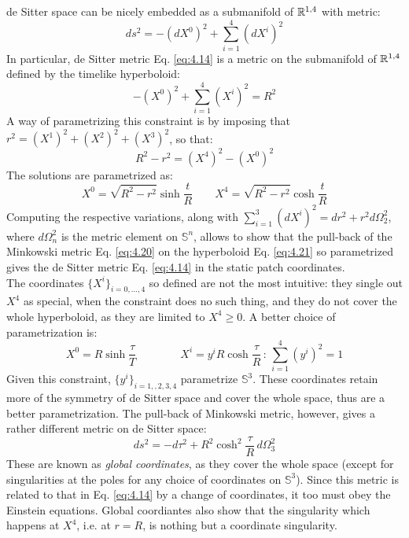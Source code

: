 de Sitter space can be nicely embedded as a submanifold of $ \mathbb{R}^{1,4} $ with metric:
\begin{equation}
  ds^2 = - (dX^0)^2 + \sum_{i = 1}^{4} (dX^i)^2
  \label{eq:4.20}
\end{equation}
In particular, de Sitter metric Eq. \ref{eq:4.14} is a metric on the submanifold of $ \mathbb{R}^{1,4} $ defined by the timelike hyperboloid:
\begin{equation}
  -(X^0)^2 + \sum_{i = 1}^{4} (X^i)^2 = R^2
  \label{eq:4.21}
\end{equation}
A way of parametrizing this constraint is by imposing that $ r^2 = (X^1)^2 + (X^2)^2 + (X^3)^2 $, so that:
\begin{equation*}
  R^2 - r^2 = (X^4)^2 - (X^0)^2
\end{equation*}
The solutions are parametrized as:
\begin{equation*}
  X^0 = \sqrt{R^2 - r^2} \sinh \frac{t}{R}
  \qquad
  X^4 = \sqrt{R^2 - r^2} \cosh \frac{t}{R}
\end{equation*}
Computing the respective variations, along with $ \sum_{i = 1}^{3} (dX^i)^2 = dr^2 + r^2 d\Omega_2^2 $, where $ d\Omega_n^2 $ is the metric element on $ \mathbb{S}^n $, allows to show that the pull-back of the Minkowski metric Eq. \ref{eq:4.20} on the hyperboloid Eq. \ref{eq:4.21} so parametrized gives the de Sitter metric Eq. \ref{eq:4.14} in the static patch coordinates.\\
The coordinates $ \{X^i\}_{i = 0,\dots,4} $ so defined are not the most intuitive: they single out $ X^4 $ as special, when the constraint does no such thing, and they do not cover the whole hyperboloid, as they are limited to $ X^4 \ge 0 $. A better choice of parametrization is:
\begin{equation*}
  X^0 = R \sinh \frac{\tau}{T}
  \qquad \qquad
  X^i = y^i R \cosh \frac{\tau}{R}
  \,:\,
  \sum_{i = 1}^{4} (y^i)^2 = 1
\end{equation*}
Given this constraint, $ \{y^i\}_{i = 1,,2,3,4} $ parametrize $ \mathbb{S}^3 $. These coordinates retain more of the symmetry of de Sitter space and cover the whole space, thus are a better parametrization. The pull-back of Minkowski metric, however, gives a rather different metric on de Sitter space:
\begin{equation}
  ds^2 = - d\tau^2 + R^2 \cosh^2 \frac{\tau}{R}\, d\Omega_3^2
  \label{eq:4.22}
\end{equation}
These are known as \textit{global coordinates}, as they cover the whole space (except for singularities at the poles for any choice of coordinates on $ \mathbb{S}^3 $). Since this metric is related to that in Eq. \ref{eq:4.14} by a change of coordinates, it too must obey the Einstein equations. Global coordiantes also show that the singularity which happens at $ X^4 $, i.e. at $ r = R $, is nothing but a coordinate singularity.

